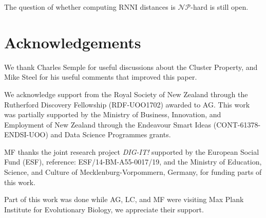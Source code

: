 \documentclass{amsart}
\newcommand{\np}{\mathcal{NP}}
\newcommand{\rnni}{\mathrm{RNNI}}
\begin{document}
The question of whether computing $\rnni$ distances is $\np$-hard is still open.


\section*{Acknowledgements}
We thank Charles Semple for useful discussions about the Cluster Property, and Mike Steel for his useful comments that improved this paper.

We acknowledge support from the Royal Society of New Zealand through the Rutherford Discovery Fellowship (RDF-UOO1702) awarded to AG.
This work was partially supported by the Ministry of Business, Innovation, and Employment of New Zealand through the Endeavour Smart Ideas (CONT-61378-ENDSI-UOO) and Data Science Programmes grants.

MF thanks the joint research project \textit{DIG-IT!} supported by the European Social Fund (ESF), reference: ESF/14-BM-A55-0017/19, and the Ministry of Education, Science, and Culture of Mecklenburg-Vorpommern, Germany, for funding parts of this work.

Part of this work was done while AG, LC, and MF were visiting Max Plank Institute for Evolutionary Biology, we appreciate their support.


\printbibliography
\end{document}
